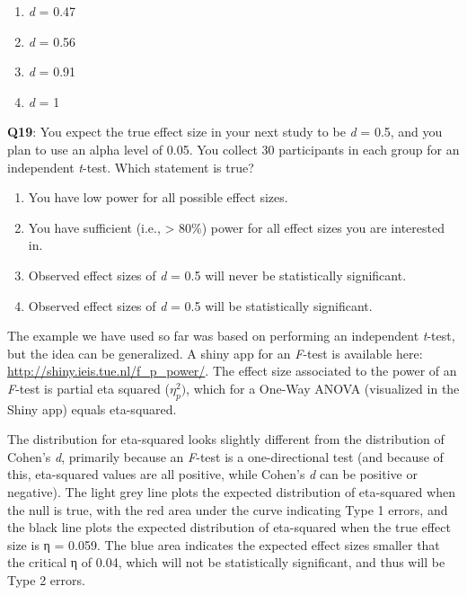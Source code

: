 \documentclass[
  oneside]{book}
\providecommand{\tightlist}{%
  \setlength{\itemsep}{0pt}\setlength{\parskip}{0pt}}
\begin{document}
\begin{enumerate}
\def\labelenumi{\Alph{enumi})}
\tightlist
\item
  \emph{d} = 0.47
\item
  \emph{d} = 0.56
\item
  \emph{d} = 0.91
\item
  \emph{d} = 1
\end{enumerate}

\textbf{Q19}: You expect the true effect size in your next study to be \emph{d} = 0.5, and you plan to use an alpha level of 0.05. You collect 30 participants in each group for an independent \emph{t}-test. Which statement is true?

\begin{enumerate}
\def\labelenumi{\Alph{enumi})}
\tightlist
\item
  You have low power for all possible effect sizes.
\item
  You have sufficient (i.e., \textgreater{} 80\%) power for all effect sizes you are interested in.
\item
  Observed effect sizes of \emph{d} = 0.5 will never be statistically significant.
\item
  Observed effect sizes of \emph{d} = 0.5 will be statistically significant.
\end{enumerate}

The example we have used so far was based on performing an independent \emph{t}-test, but the idea can be generalized. A shiny app for an \emph{F}-test is available here: \url{http://shiny.ieis.tue.nl/f_p_power/}. The effect size associated to the power of an \emph{F}-test is partial eta squared (\(\eta_{p}^{2})\), which for a One-Way ANOVA (visualized in the Shiny app) equals eta-squared.

The distribution for eta-squared looks slightly different from the distribution of Cohen's \emph{d}, primarily because an \emph{F}-test is a one-directional test (and because of this, eta-squared values are all positive, while Cohen's \emph{d} can be positive or negative). The light grey line plots the expected distribution of eta-squared when the null is true, with the red area under the curve indicating Type 1 errors, and the black line plots the expected distribution of eta-squared when the true effect size is η = 0.059. The blue area indicates the expected effect sizes smaller that the critical η of 0.04, which will not be statistically significant, and thus will be Type 2 errors.
\end{document}

